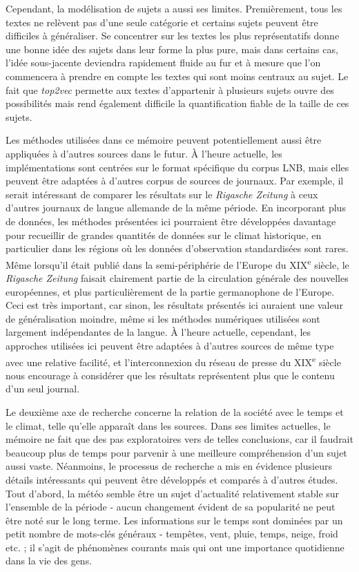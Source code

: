 \documentclass[a4paper,twoside,12pt]{article}
\begin{document}
Cependant, la modélisation de sujets a aussi ses limites. Premièrement, tous les textes ne relèvent pas d'une seule catégorie et certains sujets peuvent être difficiles à généraliser. Se concentrer sur les textes les plus représentatifs donne une bonne idée des sujets dans leur forme la plus pure, mais dans certains cas, l'idée sous-jacente deviendra rapidement fluide au fur et à mesure que l'on commencera à prendre en compte les textes qui sont moins centraux au sujet. Le fait que \textit{top2vec} permette aux textes d'appartenir à plusieurs sujets ouvre des possibilités mais rend également difficile la quantification fiable de la taille de ces sujets.

Les méthodes utilisées dans ce mémoire peuvent potentiellement aussi être appliquées à d'autres sources dans le futur. À l'heure actuelle, les implémentations sont centrées sur le format spécifique du corpus LNB, mais elles peuvent être adaptées à d'autres corpus de sources de journaux. Par exemple, il serait intéressant de comparer les résultats sur le \textit{Rigasche Zeitung} à ceux d'autres journaux de langue allemande de la même période. En incorporant plus de données, les méthodes présentées ici pourraient être développées davantage pour recueillir de grandes quantités de données sur le climat historique, en particulier dans les régions où les données d'observation standardisées sont rares. Même lorsqu'il était publié dans la semi-périphérie de l'Europe du XIX\textsuperscript{e} siècle, le \textit{Rigasche Zeitung} faisait clairement partie de la circulation générale des nouvelles européennes, et plus particulièrement de la partie germanophone de l'Europe. Ceci est très important, car sinon, les résultats présentés ici auraient une valeur de généralisation moindre, même si les méthodes numériques utilisées sont largement indépendantes de la langue. À l'heure actuelle, cependant, les approches utilisées ici peuvent être adaptées à d'autres sources de même type avec une relative facilité, et l'interconnexion du réseau de presse du XIX\textsuperscript{e} siècle nous encourage à considérer que les résultats représentent plus que le contenu d'un seul journal.

Le deuxième axe de recherche concerne la relation de la société avec le temps et le climat, telle qu'elle apparaît dans les sources. Dans ses limites actuelles, le mémoire ne fait que des pas exploratoires vers de telles conclusions, car il faudrait beaucoup plus de temps pour parvenir à une meilleure compréhension d'un sujet aussi vaste. Néanmoins, le processus de recherche a mis en évidence plusieurs détails intéressants qui peuvent être développés et comparés à d'autres études. Tout d'abord, la météo semble être un sujet d'actualité relativement stable sur l'ensemble de la période - aucun changement évident de sa popularité ne peut être noté sur le long terme. Les informations sur le temps sont dominées par un petit nombre de mots-clés généraux - tempêtes, vent, pluie, temps, neige, froid etc. ; il s'agit de phénomènes courants mais qui ont une importance quotidienne dans la vie des gens.
\end{document}
